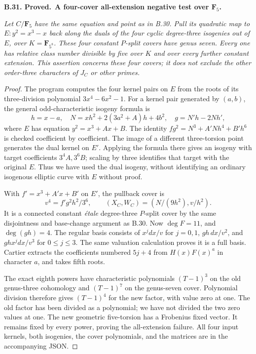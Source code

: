 \documentclass[11pt,a4paper]{article}
\newenvironment{claim}[3]{\par\medskip\noindent\hypertarget{#1}{\textbf{#1. #2.}}\ \textbf{#3.}\par\nopagebreak\smallskip\begingroup\itshape}{\endgroup\par\smallskip}
\begin{document}
\begin{claim}{B.31}{Proved}{A four-cover all-extension negative test over \(\mathbf F_5\)}
Let $C/\mathbf F_5$ have the same equation and point as in B.30.
Pull its quadratic map to $E:y^2=x^3-x$ back along the duals
of the four cyclic degree-three isogenies out of $E$, over
$K=\mathbf F_{5^8}$. These four constant $P$-split covers
have genus seven. Every one has relative class number divisible
by five over $K$ and over every further constant extension.
This assertion concerns these four covers; it does not exclude
the other order-three characters of $J_C$ or other primes.
\end{claim}
\begin{proof}
The program  computes the four
kernel pairs on $E$ from the roots of its three-division
polynomial $3x^4-6x^2-1$. For a kernel pair generated by
$(a,b)$, the general odd-characteristic isogeny formula is
\[
 h=x-a,\quad N=xh^2+2(3a^2+A)h+4b^2,
 \quad g=N'h-2Nh',
\]
where $E$ has equation $y^2=x^3+Ax+B$. The identity
$fg^2=N^3+A'Nh^4+B'h^6$ is checked coefficient by
coefficient. The image of a different three-torsion point
generates the dual kernel on $E'$. Applying the formula there
gives an isogeny with target coefficients $3^4A,3^6B$;
scaling by three identifies that target with the original $E$.
Thus we have used the dual isogeny, without identifying an
ordinary isogenous elliptic curve with $E$ without proof.

With $f'=x^3+A'x+B'$ on $E'$, the pullback cover is
\[
        v^4=f'g^2h^2/3^6,
        \qquad (X_C,W_C)=(N/(9h^2),v/h^2).
\]
It is a connected constant \emph{\'etale} degree-three
$P$-split cover by the same disjointness and base-change
argument as B.30. Now $\deg F=11$, and $\deg(gh)=4$.
The regular basis consists of $x^jdx/v$ for $j=0,1$,
$gh\,dx/v^2$, and $ghx^jdx/v^3$ for $0\le j\le3$.
The same valuation calculation proves it is a full basis.
Cartier extracts the coefficients numbered $5j+4$ from
$H(x)F(x)^a$ in character $a$, and takes fifth roots.

The exact eighth powers have characteristic polynomials
$(T-1)^3$ on the old genus-three cohomology and
$(T-1)^7$ on the genus-seven cover. Polynomial division
therefore gives $(T-1)^4$ for the new factor, with value
zero at one. The old factor has been divided as a polynomial;
we have not divided the two zero values at one.
The new geometric five-torsion has a Frobenius fixed vector.
It remains fixed by every power, proving the all-extension
failure. All four input kernels, both isogenies, the cover
polynomials, and the matrices are in the accompanying JSON.
\end{proof}
\end{document}
